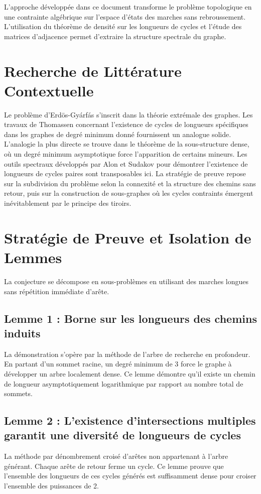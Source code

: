 \documentclass[11pt,a4paper]{article}
\begin{document}
L'approche développée dans ce document transforme le problème topologique en une contrainte algébrique sur l'espace d'états des marches sans rebroussement. L'utilisation du théorème de densité sur les longueurs de cycles et l'étude des matrices d'adjacence permet d'extraire la structure spectrale du graphe.

\section{Recherche de Littérature Contextuelle}

Le problème d'Erdös-Gyárfás s'inscrit dans la théorie extrémale des graphes. Les travaux de Thomassen concernant l'existence de cycles de longueurs spécifiques dans les graphes de degré minimum donné fournissent un analogue solide. L'analogie la plus directe se trouve dans le théorème de la sous-structure dense, où un degré minimum asymptotique force l'apparition de certains mineurs. Les outils spectraux développés par Alon et Sudakov pour démontrer l'existence de longueurs de cycles paires sont transposables ici. La stratégie de preuve repose sur la subdivision du problème selon la connexité et la structure des chemins sans retour, puis sur la construction de sous-graphes où les cycles contraints émergent inévitablement par le principe des tiroirs.

\section{Stratégie de Preuve et Isolation de Lemmes}

La conjecture se décompose en sous-problèmes en utilisant des marches longues sans répétition immédiate d'arête.

\subsection{Lemme 1 : Borne sur les longueurs des chemins induits}
La démonstration s'opère par la méthode de l'arbre de recherche en profondeur. En partant d'un sommet racine, un degré minimum de 3 force le graphe à développer un arbre localement dense. Ce lemme démontre qu'il existe un chemin de longueur asymptotiquement logarithmique par rapport au nombre total de sommets.

\subsection{Lemme 2 : L'existence d'intersections multiples garantit une diversité de longueurs de cycles}
La méthode par dénombrement croisé d'arêtes non appartenant à l'arbre générant. Chaque arête de retour ferme un cycle. Ce lemme prouve que l'ensemble des longueurs de ces cycles générés est suffisamment dense pour croiser l'ensemble des puissances de 2.
\end{document}
